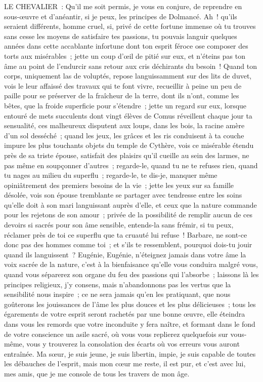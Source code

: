 \documentclass[french,twoside]{book} %
\begin{document}
LE CHEVALIER : Qu’il me soit permis, je vous en conjure, de reprendre en sous-œuvre et d’anéantir, si je peux, les principes de Dolmancé. Ah ! qu’ils seraient différents, homme cruel, si, privé de cette fortune immense où tu trouves sans cesse les moyens de satisfaire tes passions, tu pouvais languir quelques années dans cette accablante infortune dont ton esprit féroce ose composer des torts aux misérables ; jette un coup d’œil de pitié sur eux, et n’éteins pas ton âme au point de l’endurcir sans retour aux cris déchirants du besoin ! Quand ton corps, uniquement las de voluptés, repose languissamment sur des lits de duvet, vois le leur affaissé des travaux qui te font vivre, recueillir à peine un peu de paille pour se préserver de la fraîcheur de la terre, dont ils n’ont, comme les bêtes, que la froide superficie pour s’étendre ; jette un regard sur eux, lorsque entouré de mets succulents dont vingt élèves de Comus réveillent chaque jour ta sensualité, ces malheureux disputent aux loups, dans les bois, la racine amère d’un sol desséché ; quand les jeux, les grâces et les ris conduisent à ta couche impure les plus touchants objets du temple de Cythère, vois ce misérable étendu près de sa triste épouse, satisfait des plaisirs qu’il cueille au sein des larmes, ne pas même en soupçonner d’autres ; regarde-le, quand tu ne te refuses rien, quand tu nages au milieu du superflu ; regarde-le, te dis-je, manquer même opiniâtrement des premiers besoins de la vie ; jette les yeux sur sa famille désolée, vois son épouse tremblante se partager avec tendresse entre les soins qu’elle doit à son mari languissant auprès d’elle, et ceux que la nature commande pour les rejetons de son amour ; privée de la possibilité de remplir aucun de ces devoirs si sacrés pour son âme sensible, entends-la sans frémir, si tu peux, réclamer près de toi ce superflu que ta cruauté lui refuse ! Barbare, ne sont-ce donc pas des hommes comme toi ; et s’ils te ressemblent, pourquoi dois-tu jouir quand ils languissent ? Eugénie, Eugénie, n’éteignez jamais dans votre âme la voix sacrée de la nature, c’est à la bienfaisance qu’elle vous conduira malgré vous, quand vous séparerez son organe du feu des passions qui l’absorbe ; laissons là les principes religieux, j’y consens, mais n’abandonnons pas les vertus que la sensibilité nous inspire ; ce ne sera jamais qu’en les pratiquant, que nous goûterons les jouissances de l’âme les plus douces et les plus délicieuses ; tous les égarements de votre esprit seront rachetés par une bonne œuvre, elle éteindra dans vous les remords que votre inconduite y fera naître, et formant dans le fond de votre conscience un asile sacré, où vous vous replierez quelquefois sur vous-même, vous y trouverez la consolation des écarts où vos erreurs vous auront entraînée. Ma sœur, je suis jeune, je suis libertin, impie, je suis capable de toutes les débauches de l’esprit, mais mon cœur me reste, il est pur, et c’est avec lui, mes amis, que je me console de tous les travers de mon âge.\par
\end{document}
